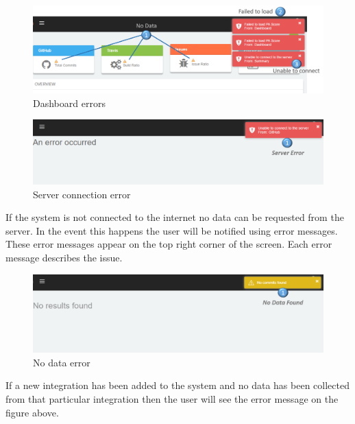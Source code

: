 \documentclass[11pt,a4paper]{article}
\begin{document}
\begin{figure}[H]
	\begin{center}
		\includegraphics[width=\linewidth]{../Images/Getting_Started/Dash_Error_numbered}
		\caption{Dashboard errors}
	\end{center}
\end{figure}

\begin{figure}[H]
	\begin{center}
		\includegraphics[width=\linewidth]{../Images/Getting_Started/Connect_Server_Detailed_numbered}
		\caption{Server connection error}
	\end{center}
\end{figure}

If the system is not connected to the internet no data can be requested from the server. In the event this happens the user will be notified using error messages. These error messages appear on the top right corner of the screen. Each error message describes the issue.

\begin{figure}[H]
	\begin{center}
		\includegraphics[width=\linewidth]{../Images/Getting_Started/No_Data_Detailed_numbered}
		\caption{No data error}
	\end{center}
\end{figure}

If a new integration has been added to the system and no data has been collected from that particular integration then the user will see the error message on the figure above. \\ 
\end{document}

